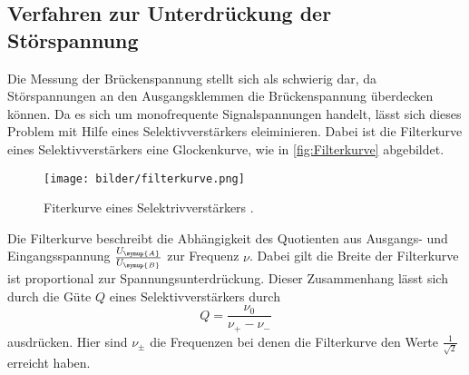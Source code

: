 \subsection{Verfahren zur Unterdrückung der Störspannung}
\label{sec:stoer}
Die Messung der Brückenspannung stellt sich als schwierig dar, da Störspannungen an den Ausgangsklemmen die
Brückenspannung überdecken können. Da es sich um monofrequente Signalspannungen handelt, lässt sich dieses
Problem mit Hilfe eines Selektivverstärkers eleiminieren. Dabei ist die Filterkurve eines Selektivverstärkers
eine Glockenkurve, wie in \autoref{fig:Filterkurve} abgebildet.
\begin{figure}
    \centering
    \texttt{[image: bilder/filterkurve.png]}
    \caption{Fiterkurve eines Selektrivverstärkers \cite{sample}.}
    \label{fig:Filterkurve}
\end{figure}
Die Filterkurve beschreibt die Abhängigkeit des Quotienten aus Ausgangs- und Eingangsspannung
$\frac{U_{\symup{A}}}{U_{\symup{B}}}$ zur Frequenz $\nu$. Dabei gilt die Breite der Filterkurve ist proportional
zur Spannungsunterdrückung. Dieser Zusammenhang lässt sich durch die Güte $Q$ eines Selektivverstärkers
durch
\begin{equation}
    Q = \frac{\nu_{0}}{\nu_{+}-\nu_{-}}
\end{equation}
ausdrücken. Hier sind $\nu_{\pm}$ die Frequenzen bei denen die Filterkurve den Werte $\frac{1}{\sqrt{2}}$ erreicht
haben.